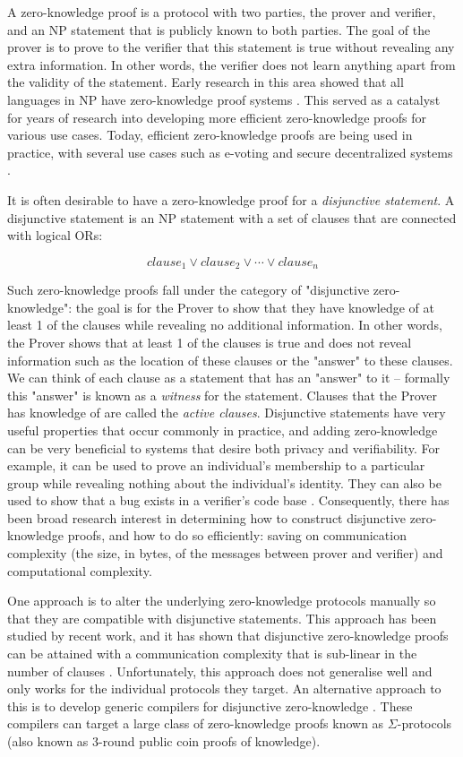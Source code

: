 A zero-knowledge proof \cite{GMR85} is a protocol with two parties, the prover and  verifier, and an NP statement that is publicly known to both parties. The goal of the prover is to prove to the verifier that this statement is true without revealing any extra information. In other words, the verifier does not learn anything apart from the validity of the statement. Early research in this area showed that all languages in NP have 
zero-knowledge proof systems \cite{DBLP:conf/focs/GoldreichMW86}. This served as a catalyst for years of research into developing 
more efficient zero-knowledge proofs for various use cases. Today, efficient zero-knowledge proofs are being used 
in practice, with several use cases such as e-voting and secure decentralized systems \cite{evoting, zcash}.

It is often desirable to have a zero-knowledge proof for a \textit{disjunctive statement}.
A disjunctive statement is an NP 
statement with a set of clauses that are connected with logical ORs:

$$
clause_1 \lor clause_2 \lor \cdots \lor clause_n
$$

Such zero-knowledge proofs fall under the category of "disjunctive zero-knowledge": the goal is for the Prover 
to show that they have knowledge of at least 1 of the clauses while revealing no additional information. 
In other words, the Prover shows that at least 1 of the clauses is true and does not reveal 
information such as the location of these clauses or the "answer" to these clauses. 
We can think of each clause as a statement that has an "answer" to it -- formally this "answer" 
is known as a \textit{witness} for the statement. Clauses that the Prover has 
knowledge of are called the \textit{active clauses}. 
Disjunctive statements have very useful properties that occur commonly in practice, and adding zero-knowledge can be very beneficial to  
systems that desire both privacy and verifiability. For example, it can be used to prove an 
individual's membership to a particular group while revealing nothing about the individual's identity. 
They can also be used to show that a bug exists in a verifier's code base \cite{StackedGF}. Consequently, there has been broad research interest in determining how to construct disjunctive zero-knowledge proofs, and how to do so efficiently: saving on communication complexity (the size, in bytes, of the messages between prover and verifier) and computational complexity.  

One approach is to alter the underlying zero-knowledge protocols manually so that they are compatible with disjunctive statements. This approach has been studied by recent work, and it has shown that disjunctive zero-knowledge proofs can be attained with a communication complexity that is sub-linear in the number of clauses \cite{StackedGF,attema}. Unfortunately, this approach does not generalise well and only works for the individual protocols
they target. An alternative approach to this is to develop generic compilers for disjunctive zero-knowledge \cite{CDS94,StackingSigmas}. These 
compilers can target a large class of zero-knowledge proofs known as $\Sigma$-protocols (also known as 
3-round public coin proofs of knowledge).

